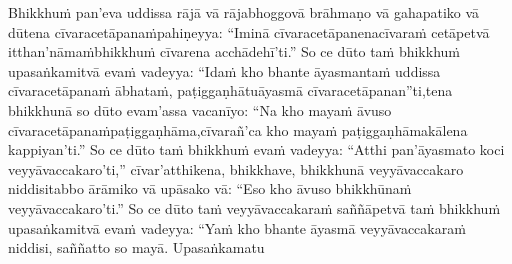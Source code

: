 Bhikkhuṁ pan'eva uddissa rājā vā rājabhoggo\makeatletter\hyperlink{endnote151-appendix}\makeatother \thinspace vā brāhmaṇo vā gahapatiko vā dūtena cīvaracetāpanaṁ\makeatletter\hyperlink{endnote152-appendix}\makeatother \thinspace pahiṇeyya: ``Iminā cīvaracetāpanena\makeatletter\hyperlink{endnote153-appendix}\makeatother \thinspace cīvaraṁ cetāpetvā itthan'nāmaṁ\makeatletter\hyperlink{endnote154-appendix}\makeatother \thinspace bhikkhuṁ cīvarena acchādehī'ti.'' So ce dūto taṁ bhikkhuṁ upasaṅkamitvā evaṁ vadeyya: ``Idaṁ kho bhante āyasmantaṁ uddissa cīvaracetāpanaṁ ābhataṁ, paṭiggaṇhātu\makeatletter\hyperlink{endnote155-appendix}\makeatother \thinspace āyasmā cīvaracetāpanan''ti,\makeatletter\hyperlink{endnote156-appendix}\makeatother \thinspace tena bhikkhunā so dūto evam'assa vacanīyo: ``Na kho mayaṁ āvuso cīvaracetāpanaṁ\makeatletter\hyperlink{endnote157-appendix}\makeatother \thinspace paṭiggaṇhāma,\makeatletter\hyperlink{endnote158-appendix}\makeatother \thinspace cīvarañ'ca kho mayaṁ paṭiggaṇhāma\makeatletter\hyperlink{endnote159-appendix}\makeatother \thinspace kālena kappiyan'ti.'' So ce dūto taṁ bhikkhuṁ evaṁ vadeyya: ``Atthi pan'āyasmato koci veyyāvaccakaro'ti,'' cīvar'atthikena, bhikkhave, bhikkhunā veyyāvaccakaro niddisitabbo ārāmiko vā upāsako vā: ``Eso kho āvuso bhikkhūnaṁ veyyāvaccakaro'ti.'' So ce dūto taṁ veyyāvaccakaraṁ saññāpetvā taṁ bhikkhuṁ upasaṅkamitvā evaṁ vadeyya: ``Yaṁ kho bhante āyasmā veyyāvaccakaraṁ niddisi, saññatto so mayā. Upasaṅkamatu\makeatletter\hyperlink{endnote160-appendix}
